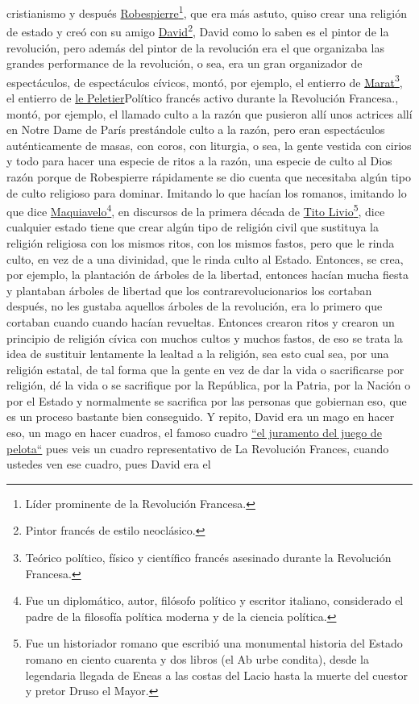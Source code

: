 cristianismo y después \href{https://en.wikipedia.org/wiki/Maximilien_Robespierre}{Robespierre}\footnote{Líder prominente de la Revolución Francesa.}, que era más astuto, quiso crear una religión de estado y creó con su amigo \href{https://en.wikipedia.org/wiki/Jacques-Louis_David}{David}\footnote{Pintor francés de estilo neoclásico.}, David como lo saben es el pintor de la revolución, pero además del pintor de la revolución era el que organizaba las grandes performance de la revolución, o sea, era un gran organizador de espectáculos, de espectáculos cívicos, montó, por ejemplo, el entierro de \href{https://en.wikipedia.org/wiki/Jean-Paul_Marat}{Marat}\footnote{Teórico político, físico y científico francés asesinado durante la Revolución Francesa.}, el entierro de \href{https://en.wikipedia.org/wiki/Louis-Michel_le_Peletier,_marquis_de_Saint-Fargeau}{le Peletier}{Político francés activo durante la Revolución Francesa.}, montó, por ejemplo, el llamado culto a la razón que pusieron allí unos actrices allí en Notre Dame de París prestándole culto a la razón, pero eran  espectáculos auténticamente de masas, con coros, con liturgia, o sea, la gente vestida con cirios y todo para hacer una especie de ritos a la razón, una especie de culto al Dios razón porque de Robespierre rápidamente se dio cuenta que necesitaba algún tipo de culto religioso para dominar. Imitando lo que hacían los romanos, imitando lo que dice \href{https://en.wikipedia.org/wiki/Niccol%C3%B2_Machiavelli}{Maquiavelo}\footnote{Fue un diplomático, autor, filósofo político y escritor italiano, considerado el padre de la filosofía política moderna y de la ciencia política.}, en discursos de la primera década de \href{https://en.wikipedia.org/wiki/Livy}{Tito Livio}\footnote{Fue un historiador romano que escribió una monumental historia del Estado romano en ciento cuarenta y dos libros (el Ab urbe condita), desde la legendaria llegada de Eneas a las costas del Lacio hasta la muerte del cuestor y pretor Druso el Mayor.}, dice cualquier estado tiene que crear algún tipo de religión civil que sustituya la religión religiosa con los mismos ritos, con los mismos fastos, pero que le rinda culto, en vez de a una divinidad, que le rinda culto al Estado. Entonces, se crea, por ejemplo, la plantación de árboles de la libertad, entonces hacían mucha fiesta y plantaban árboles de libertad que los contrarevolucionarios los cortaban después, no les gustaba aquellos árboles de la revolución, era lo primero que cortaban cuando cuando hacían revueltas. Entonces crearon ritos y crearon un principio de religión cívica con muchos cultos y muchos fastos, de eso se trata la idea de sustituir lentamente la lealtad a la religión, sea esto cual sea, por una religión estatal, de tal forma que la gente en vez de dar la vida o sacrificarse por religión, dé la vida o se sacrifique por la República, por la Patria, por la Nación o por el Estado y normalmente se sacrifica por las personas que gobiernan eso, que es un proceso bastante bien conseguido. Y repito, David era un mago en hacer eso, un mago en hacer cuadros, el famoso cuadro \href{https://en.wikipedia.org/wiki/The_Tennis_Court_Oath_(David)}{``el juramento del juego de pelota``} pues veis un cuadro representativo de La Revolución Frances, cuando ustedes ven ese cuadro, pues David era el 